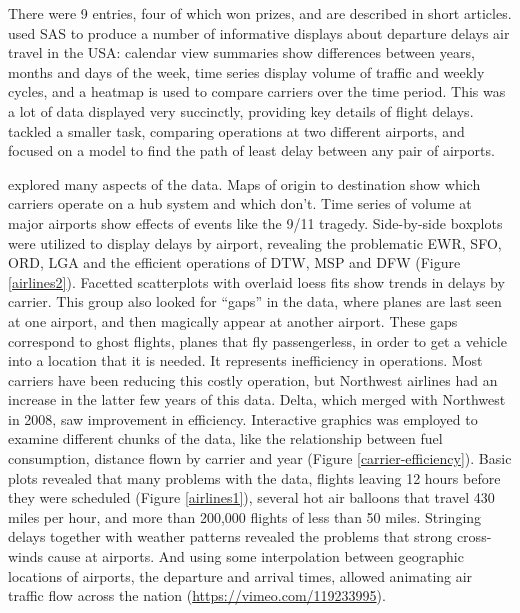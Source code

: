 \documentclass[11pt]{article}
\begin{document}
There were 9 entries, four of which won prizes, and are described in short articles. \citet{expo-wicklin} used SAS to produce a number of informative displays about departure delays air travel in the USA: calendar view summaries show differences between years, months and days of the week, time series display volume of traffic and weekly cycles, and a heatmap is used to compare carriers over the time period. This was a lot of data displayed very succinctly, providing key details of flight delays. \citet{expo-wickham} tackled a smaller task, comparing operations at two different airports, and \citet{expo-dey} focused on a model to find the path of least delay between any pair of airports.

\citet{expo-hofmann} explored many aspects of the data. Maps of origin to destination show which carriers operate on a hub system and which don't. Time series of volume at major airports show effects of events like the 9/11 tragedy. Side-by-side boxplots were utilized to display delays by airport, revealing the problematic EWR, SFO, ORD, LGA and the efficient operations of DTW, MSP and DFW (Figure \ref{airlines2}). Facetted scatterplots with overlaid loess fits show trends in delays by carrier. This group also looked for ``gaps'' in the data, where planes are last seen at one airport, and then magically appear at another airport. These gaps correspond to ghost flights, planes that fly passengerless, in order to get a vehicle into a location that it is needed. It represents inefficiency in operations. Most carriers have been reducing this costly operation, but Northwest airlines had an increase in the latter few years of this data. Delta, which merged with Northwest in 2008, saw improvement in efficiency. Interactive graphics was employed to examine different chunks of the data, like the relationship between fuel consumption, distance flown by carrier and year (Figure \ref{carrier-efficiency}). Basic plots revealed that many problems with the data, flights leaving 12 hours before they were scheduled (Figure \ref{airlines1}), several hot air balloons that travel 430 miles per hour, and more than 200,000 flights of less than 50 miles. Stringing delays together with weather patterns revealed the problems that strong cross-winds cause at airports. And using some interpolation between geographic locations of airports, the departure and arrival times, allowed animating air traffic flow across the nation (\url{https://vimeo.com/119233995}).
\end{document}
